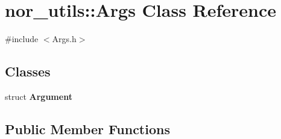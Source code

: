 \hypertarget{classnor__utils_1_1Args}{
\section{nor\_\-utils::Args Class Reference}
\label{classnor__utils_1_1Args}
}


{\ttfamily \#include $<$Args.h$>$}

\subsection*{Classes}
\begin{DoxyCompactItemize}
\item 
struct {\bfseries Argument}
\end{DoxyCompactItemize}
\subsection*{Public Member Functions}
